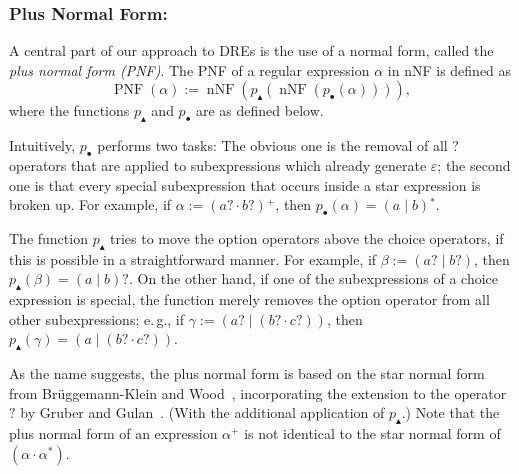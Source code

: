 \documentclass[a4paper,11pt, svgnames,titlepage]{article}
\newcommand{\rxp}{{^\mathtt{+}}}
\newcommand{\rxs}{{^\mathtt{*}}}
\newcommand{\rxo}{\mathtt{?}}
\newcommand{\rxc}{\cdot}
\DeclareMathOperator{\ror}{\mathtt{|}}
\newcommand{\emptyword}{\varepsilon}
\newcommand{\df}{:=}
\newcommand{\wpnffun}{p_{\bullet}}
\newcommand{\pnfupfun}{p_{\blacktriangle}}
\newcommand{\wpnf}[1]{\wpnffun{\left(#1\right)}}
\newcommand{\pnfup}[1]{\pnfupfun{\left(#1\right)}}
\DeclareMathOperator{\nnf}{nNF}
\DeclareMathOperator{\pnf}{PNF}
\begin{document}
\subsubsection{Plus Normal Form:} A central part of our approach to DREs is the use of a normal form, called the \emph{plus normal form (PNF)}. The PNF of a regular expression $\alpha$ in nNF is defined as 
$$\pnf(\alpha)\df\nnf(\pnfup{\nnf(\wpnf{\alpha})}),$$
where the functions $\pnfupfun$ and $\wpnffun$ are as defined below. 

Intuitively, $\wpnffun$ performs two tasks: The obvious one is the removal of all $\rxo$ operators that are applied to subexpressions which already generate $\emptyword$; the second one is that every special subexpression that occurs inside a star expression is broken up. For example, if $\alpha\df (a\rxo \rxc b\rxo)\rxp$, then $\wpnf{\alpha}= (a\ror b)\rxs$.

The function $\pnfupfun$ tries to move the option operators above the choice operators, if this is possible in a straightforward manner. For example, if $\beta\df (a\rxo \ror b\rxo)$, then $\pnfup{\beta}=(a\ror b)\rxo$. On the other hand, if one of the subexpressions of a choice expression is special, the function merely removes the option operator from all other subexpressions; e.\,g., if $\gamma\df ( a\rxo \ror (b\rxo\rxc c\rxo))$, then $\pnfup{\gamma}=(a \ror (b\rxo\rxc c\rxo) )$.

As the name suggests, the plus normal form is based on the star normal form from Brüggemann-Klein and Wood~\cite{bru:one}, incorporating the extension to the operator $\rxo$ by Gruber and Gulan~\cite{gru:sim}. (With the additional application of $\pnfupfun$.) Note that the plus normal form of an expression $\alpha\rxp$ is not identical to the star normal form of $(\alpha \rxc \alpha\rxs)$. 
\end{document}
